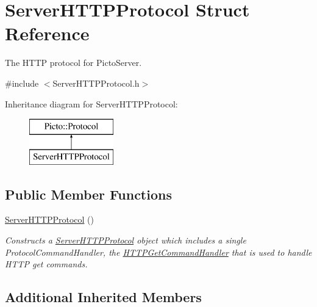 \hypertarget{struct_server_h_t_t_p_protocol}{\section{Server\-H\-T\-T\-P\-Protocol Struct Reference}
\label{struct_server_h_t_t_p_protocol}
}


The H\-T\-T\-P protocol for Picto\-Server.  




{\ttfamily \#include $<$Server\-H\-T\-T\-P\-Protocol.\-h$>$}

Inheritance diagram for Server\-H\-T\-T\-P\-Protocol\-:\begin{figure}[H]
\begin{center}
\leavevmode
\includegraphics[height=2.000000cm]{struct_server_h_t_t_p_protocol}
\end{center}
\end{figure}
\subsection*{Public Member Functions}
\begin{DoxyCompactItemize}
\item 
\hypertarget{struct_server_h_t_t_p_protocol_af1f3b4ed13fe53dce3a21e462ef738f1}{\hyperlink{struct_server_h_t_t_p_protocol_af1f3b4ed13fe53dce3a21e462ef738f1}{Server\-H\-T\-T\-P\-Protocol} ()}\label{struct_server_h_t_t_p_protocol_af1f3b4ed13fe53dce3a21e462ef738f1}

\begin{DoxyCompactList}\small\item\em Constructs a \hyperlink{struct_server_h_t_t_p_protocol}{Server\-H\-T\-T\-P\-Protocol} object which includes a single Protocol\-Command\-Handler, the \hyperlink{struct_h_t_t_p_get_command_handler}{H\-T\-T\-P\-Get\-Command\-Handler} that is used to handle H\-T\-T\-P get commands. \end{DoxyCompactList}\end{DoxyCompactItemize}
\subsection*{Additional Inherited Members}


